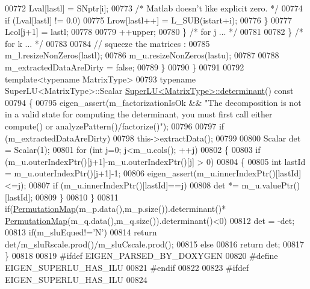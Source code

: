 \begin{DoxyCode}
00772           Lval[lastl] = SNptr[i];
00773           \textcolor{comment}{/* Matlab doesn't like explicit zero. */}
00774           \textcolor{keywordflow}{if} (Lval[lastl] != 0.0)
00775             Lrow[lastl++] = L\_SUB(istart+i);
00776         \}
00777         Lcol[j+1] = lastl;
00778 
00779         ++upper;
00780       \} \textcolor{comment}{/* for j ... */}
00781 
00782     \} \textcolor{comment}{/* for k ... */}
00783 
00784     \textcolor{comment}{// squeeze the matrices :}
00785     m\_l.resizeNonZeros(lastl);
00786     m\_u.resizeNonZeros(lastu);
00787 
00788     m\_extractedDataAreDirty = \textcolor{keyword}{false};
00789   \}
00790 \}
00791 
00792 \textcolor{keyword}{template}<\textcolor{keyword}{typename} MatrixType>
00793 \textcolor{keyword}{typename} SuperLU<MatrixType>::Scalar \hyperlink{class_eigen_1_1_super_l_u}{SuperLU<MatrixType>::determinant}()\textcolor{keyword}{
       const}
00794 \textcolor{keyword}{}\{
00795   eigen\_assert(m\_factorizationIsOk && \textcolor{stringliteral}{"The decomposition is not in a valid state for computing the
       determinant, you must first call either compute() or analyzePattern()/factorize()"});
00796   
00797   \textcolor{keywordflow}{if} (m\_extractedDataAreDirty)
00798     this->extractData();
00799 
00800   Scalar det = Scalar(1);
00801   \textcolor{keywordflow}{for} (\textcolor{keywordtype}{int} j=0; j<m\_u.cols(); ++j)
00802   \{
00803     \textcolor{keywordflow}{if} (m\_u.outerIndexPtr()[j+1]-m\_u.outerIndexPtr()[j] > 0)
00804     \{
00805       \textcolor{keywordtype}{int} lastId = m\_u.outerIndexPtr()[j+1]-1;
00806       eigen\_assert(m\_u.innerIndexPtr()[lastId]<=j);
00807       \textcolor{keywordflow}{if} (m\_u.innerIndexPtr()[lastId]==j)
00808         det *= m\_u.valuePtr()[lastId];
00809     \}
00810   \}
00811   \textcolor{keywordflow}{if}(\hyperlink{group___core___module_class_eigen_1_1_map}{PermutationMap}(m\_p.data(),m\_p.size()).determinant()*
      \hyperlink{group___core___module_class_eigen_1_1_map}{PermutationMap}(m\_q.data(),m\_q.size()).determinant()<0)
00812     det = -det;
00813   \textcolor{keywordflow}{if}(m\_sluEqued!=\textcolor{charliteral}{'N'})
00814     \textcolor{keywordflow}{return} det/m\_sluRscale.prod()/m\_sluCscale.prod();
00815   \textcolor{keywordflow}{else}
00816     \textcolor{keywordflow}{return} det;
00817 \}
00818 
00819 \textcolor{preprocessor}{#ifdef EIGEN\_PARSED\_BY\_DOXYGEN}
00820 \textcolor{preprocessor}{#define EIGEN\_SUPERLU\_HAS\_ILU}
00821 \textcolor{preprocessor}{#endif}
00822 
00823 \textcolor{preprocessor}{#ifdef EIGEN\_SUPERLU\_HAS\_ILU}
00824 

\end{DoxyCode}
